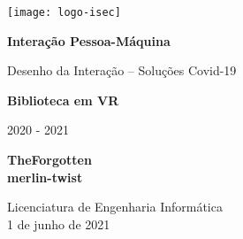 \begin{titlepage}
	\begin{center}
		\texttt{[image: logo-isec]}
		
		\vspace*{\fill}
		
		\Huge
		\textbf{Interação Pessoa-Máquina}
		
		\huge
		Desenho da Interação – Soluções Covid-19
		
		\vspace{1cm}
		
		\Huge
		\textbf{Biblioteca em VR}
		
		\vspace{1cm}
		
		\LARGE
		2020 - 2021
		
		\vspace{1.5cm}
		
		\textbf{TheForgotten\\merlin-twist}
		
		\vfill
		\vspace*{\fill}
		
		\normalsize
		Licenciatura de Engenharia Informática \\
		1 de junho de 2021		
	\end{center}
\end{titlepage}